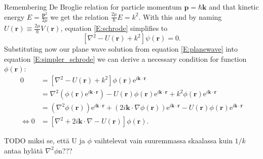 \documentclass[a4paper, twoside, english, 12pt]{article}
\begin{document}
Remembering De Broglie relation for particle momentum $\mathbf{p}=\hbar\mathbf{k}$ and that kinetic energy $E=\frac{\mathbf{p}^2}{2\mu}$ we get the relation $\frac{2\mu}{\hbar}E=k^2$. With this and by naming $U(\mathbf{r})\equiv\frac{2\mu}{\hbar}V(\mathbf{r})$, equation \ref{E:schrode} simplifies to
\begin{equation}\label{E:simpler_schrode}
	\left[\nabla^2-U(\mathbf{r})+k^2\right]\psi(\mathbf{r}) = 0.
\end{equation}
Substituting now our plane wave solution from equation \ref{E:planewave} into equation \ref{E:simpler_schrode} we can derive a necessary condition for function $\phi(\mathbf{r})$:
\begin{align}\label{E:phi_schrode}
	0 &= \left[\nabla^2-U(\mathbf{r})+k^2\right]\phi(\mathbf{r})\mathrm{e}^{i \mathbf{k}\cdot\mathbf{r}} \nonumber\\
	&=\nabla^2\left(\phi(\mathbf{r})\mathrm{e}^{i \mathbf{k}\cdot\mathbf{r}}\right)-U(\mathbf{r})\phi(\mathbf{r})\mathrm{e}^{i \mathbf{k}\cdot\mathbf{r}}+k^2\phi(\mathbf{r})\mathrm{e}^{i \mathbf{k}\cdot\mathbf{r}} \nonumber\\
	&=\left(\nabla^2\phi(\mathbf{r})\right)\mathrm{e}^{i \mathbf{k}\cdot\mathbf{r}} + \left(2i\mathbf{k}\cdot\nabla\phi(\mathbf{r})\right)\mathrm{e}^{i \mathbf{k}\cdot\mathbf{r}}  -U(\mathbf{r})\phi(\mathbf{r})\mathrm{e}^{i \mathbf{k}\cdot\mathbf{r}} \nonumber\\
\iff 0 &= \left[\nabla^2 +2i\mathbf{k}\cdot\nabla -U(\mathbf{r})\right]\phi(\mathbf{r}).
\end{align}

TODO miksi se, että U ja $\phi$ vaihtelevat vain suuremmassa skaalassa kuin $1/k$ antaa hylätä $\nabla^2\phi$n???
\end{document}
